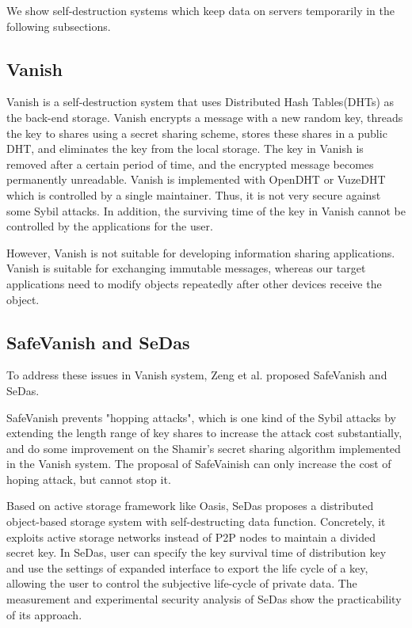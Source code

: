 \documentclass[a4paper,11pt]{report}
\begin{document}
We show self-destruction systems which keep data on servers temporarily in the following subsections.

\subsection{Vanish}

Vanish\cite{geambasu2009vanish} is a self-destruction system that uses Distributed Hash Tables(DHTs) as the back-end storage.
Vanish encrypts a message with a new random key, threads the key to shares using a secret sharing scheme, stores these shares in a public DHT, and eliminates the key from the local storage.
The key in Vanish is removed after a certain period of time, and the encrypted message becomes permanently unreadable.
Vanish is implemented with OpenDHT\cite{rhea2005opendht} or VuzeDHT\cite{vuzedht} which is controlled by a single maintainer. 
Thus, it is not very secure against some Sybil attacks\cite{cholez2009evaluation, wolchok2010defeating}. 
In addition, the surviving time of the key in Vanish cannot be controlled by the applications for the user.

However, Vanish is not suitable for developing information sharing applications. 
Vanish is suitable for exchanging immutable messages, whereas our target applications need to modify objects repeatedly after other devices receive the object.


\subsection{SafeVanish and SeDas}

To address these issues in Vanish system, Zeng et al. proposed SafeVanish\cite{zeng2010safevanish} and SeDas\cite{zeng2012sedas}. 

SafeVanish prevents "hopping attacks"\cite{wolchok2010defeating}, which is one kind of the Sybil attacks\cite{cholez2009evaluation, wolchok2010defeating} by extending the length range of key shares to increase the attack cost substantially, and do some improvement on the Shamir's secret sharing algorithm implemented in the Vanish system.
The proposal of SafeVainish can only increase the cost of hoping attack, but cannot stop it.

Based on active storage framework like Oasis\cite{xie2011design}, SeDas proposes a distributed object-based storage system with self-destructing data function.
Concretely, it exploits active storage networks instead of P2P nodes to maintain a divided secret key. 
In SeDas, user can specify the key survival time of distribution key and use the settings of expanded interface to export the life cycle of a key, allowing the user to control the subjective life-cycle of private data.
The measurement and experimental security analysis of SeDas show the practicability of its approach.
\end{document}
